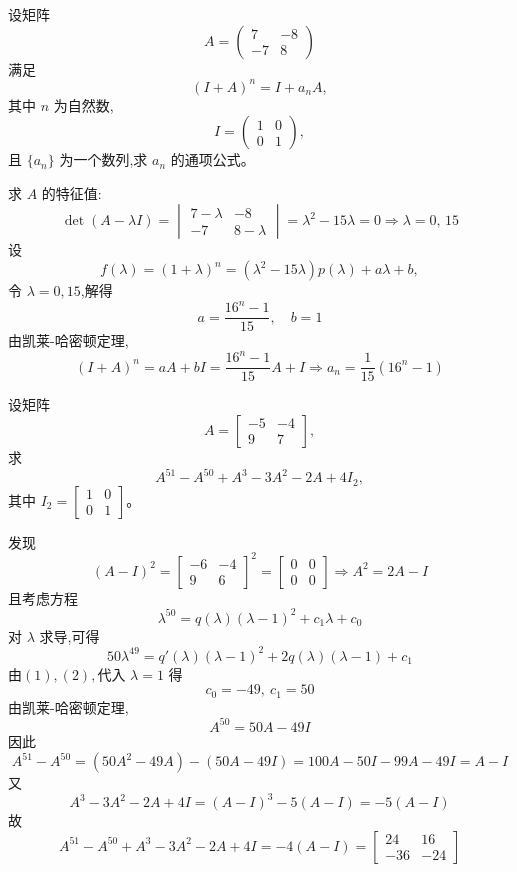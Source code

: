 \begin{questions}
    \question 设矩阵 $$A=\begin{pmatrix} 7 & -8 \\ -7 & 8 \end{pmatrix}$$ 满足 $$(I+A)^n = I + a_n A,$$其中 $n$ 为自然数,$$I=\begin{pmatrix} 1 & 0 \\ 0 & 1 \end{pmatrix},$$且 $\{a_n\}$ 为一个数列,求 $a_n$ 的通项公式。
    \begin{solution}
        求 $A$ 的特征值:
        \[
        \det(A - \lambda I) = \begin{vmatrix} 7 - \lambda & -8 \\ -7 & 8 - \lambda \end{vmatrix} = \lambda^2 - 15\lambda = 0 \Rightarrow \lambda = 0,\,15
        \]
        设 
        \[
        f(\lambda) = (1+\lambda)^n = (\lambda^2 - 15\lambda)p(\lambda) + a\lambda + b,
        \]令 $\lambda=0,15$,解得
        \[
        a = \frac{16^n - 1}{15},\quad b = 1
        \]
        由凯莱-哈密顿定理,
        \[
        (I + A)^n = aA + bI = \frac{16^n - 1}{15}A + I
        \Rightarrow a_n = \frac{1}{15}(16^n - 1)
        \]
    \end{solution}

    \question 设矩阵 
    \[
    A = \begin{bmatrix} -5 & -4 \\ 9 & 7 \end{bmatrix}, 
    \] 
    求 
    \[
    A^{51} - A^{50} + A^3 - 3A^2 - 2A + 4I_2,
    \] 
    其中 \(I_2 = \begin{bmatrix} 1 & 0 \\ 0 & 1 \end{bmatrix}\)。
    \begin{solution}
        发现 
        \[
        (A-I)^2 = {\begin{bmatrix}-6 & -4 \\ 9 & 6\end{bmatrix}}^2=\begin{bmatrix}0 & 0 \\ 0 & 0\end{bmatrix} \Rightarrow A^2=2A-I
        \] 
        且考虑方程
        \[
        \lambda^{50} = q(\lambda)(\lambda-1)^2 + c_1 \lambda + c_0 \tag{1}
        \]
        对 \(\lambda\) 求导,可得
        \[
        50\lambda^{49}=q'(\lambda)(\lambda-1)^2+2q(\lambda)(\lambda-1)+c_1 \tag{2}
        \]
        由$(1),(2),$代入 \(\lambda=1\) 得 
        \[
        c_0=-49, \ c_1=50
        \]
        由凯莱-哈密顿定理,
        \[
        A^{50} = 50A - 49I
        \] 
        因此 
        \[
        A^{51} - A^{50} = (50A^2-49A) - (50A - 49I) = 100A-50I -99A - 49I=A-I
        \]
        又 
        \[
        A^3 - 3A^2 - 2A + 4I = (A-I)^3-5(A-I)=-5(A-I)
        \] 
        故
        \[
        A^{51} - A^{50} + A^3 - 3A^2 - 2A + 4I = -4(A-I) = \begin{bmatrix} 24 & 16 \\ -36 & -24 \end{bmatrix}
        \]
    \end{solution}


\end{questions}
